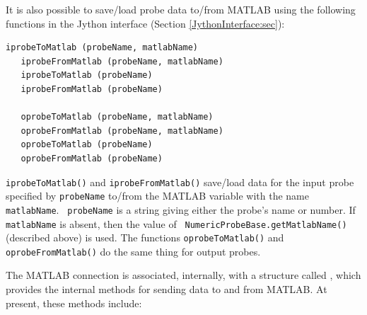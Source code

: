 \documentclass{article}
\begin{document}
It is also possible to save/load probe data to/from MATLAB using the
following functions in the Jython interface (Section
\ref{JythonInterface:sec}):
%
\begin{lstlisting}[]
   iprobeToMatlab (probeName, matlabName)
   iprobeFromMatlab (probeName, matlabName)
   iprobeToMatlab (probeName)
   iprobeFromMatlab (probeName)

   oprobeToMatlab (probeName, matlabName)
   oprobeFromMatlab (probeName, matlabName)
   oprobeToMatlab (probeName)
   oprobeFromMatlab (probeName)
\end{lstlisting}
%
{\tt iprobeToMatlab()} and {\tt iprobeFromMatlab()}
save/load data for the input probe specified by {\tt probeName}
to/from the MATLAB variable with the name {\tt matlabName}. {\tt
probeName} is a string giving either the probe's name or number.  If
{\tt matlabName} is absent, then the value of {\tt
NumericProbeBase.getMatlabName()} (described above) is used.  The
functions {\tt oprobeToMatlab()} and {\tt oprobeFromMatlab()} do the
same thing for output probes.

The MATLAB connection is associated, internally, with a structure
called , which
provides the internal methods for sending data to and from MATLAB.  At
present, these methods include:
\end{document}
